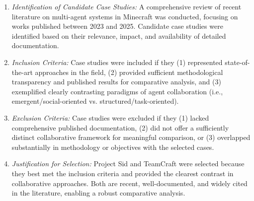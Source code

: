 \documentclass[a4paper, 12pt]{article}
\begin{document}
\begin{enumerate}[label=(\alph*)]
    \item \textit{Identification of Candidate Case Studies:} A comprehensive review of recent literature on multi-agent systems in Minecraft was conducted, focusing on works published between 2023 and 2025. Candidate case studies were identified based on their relevance, impact, and availability of detailed documentation.
    \item \textit{Inclusion Criteria:} Case studies were included if they (1) represented state-of-the-art approaches in the field, (2) provided sufficient methodological transparency and published results for comparative analysis, and (3) exemplified clearly contrasting paradigms of agent collaboration (i.e., emergent/social-oriented vs. structured/task-oriented).
    \item \textit{Exclusion Criteria:} Case studies were excluded if they (1) lacked comprehensive published documentation, (2) did not offer a sufficiently distinct collaborative framework for meaningful comparison, or (3) overlapped substantially in methodology or objectives with the selected cases.
    \item \textit{Justification for Selection:} Project Sid and TeamCraft were selected because they best met the inclusion criteria and provided the clearest contrast in collaborative approaches. Both are recent, well-documented, and widely cited in the literature, enabling a robust comparative analysis.

\end{enumerate}
\end{document}
